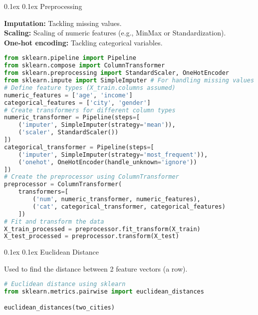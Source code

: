 \documentclass[8pt,landscape]{article}
\makeatletter
\renewcommand{\subsection}{\@startsection{subsection}{2}{0pt}%
    {0.1ex}%
    {0.1ex}%
    {\fontsize{8}{9}\bfseries\color{blue}}} %
\newcommand{\smalltext}[1]{%
  {\fontsize{8}{9}\selectfont\sloppy #1\par}%
}
\makeatother
\begin{document}
\begin{multicols}{3}
\subsection{Preprocessing}
\smalltext{
\textbf{Imputation:} Tackling missing values. \\
\textbf{Scaling:} Scaling of numeric features (e.g., MinMax or Standardization). \\
\textbf{One-hot encoding:} Tackling categorical variables.
}
\begin{lstlisting}[language=Python]
from sklearn.pipeline import Pipeline
from sklearn.compose import ColumnTransformer
from sklearn.preprocessing import StandardScaler, OneHotEncoder
from sklearn.impute import SimpleImputer # For handling missing values
# Define feature types (X_train.columns assumed)
numeric_features = ['age', 'income']
categorical_features = ['city', 'gender']
# Create transformers for different column types
numeric_transformer = Pipeline(steps=[
    ('imputer', SimpleImputer(strategy='mean')),
    ('scaler', StandardScaler())
])
categorical_transformer = Pipeline(steps=[
    ('imputer', SimpleImputer(strategy='most_frequent')),
    ('onehot', OneHotEncoder(handle_unknown='ignore'))
])
# Create the preprocessor using ColumnTransformer
preprocessor = ColumnTransformer(
    transformers=[
        ('num', numeric_transformer, numeric_features),
        ('cat', categorical_transformer, categorical_features)
    ])
# Fit and transform the data
X_train_processed = preprocessor.fit_transform(X_train)
X_test_processed = preprocessor.transform(X_test)
\end{lstlisting}

\subsection{Euclidean Distance}
\smalltext{
Used to find the distance between 2 feature vectors (a row).
}
\begin{lstlisting}[language=Python]
# Euclidean distance using sklearn
from sklearn.metrics.pairwise import euclidean_distances

euclidean_distances(two_cities)
\end{lstlisting}


\end{multicols}
\end{document}
